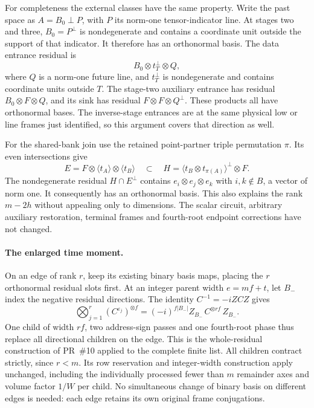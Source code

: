 For completeness the external classes have the same property. Write the
past space as $A=B_0\mathbin\perp P$, with $P$ its norm-one tensor-indicator
line. At stages two and three, $B_0=P^\perp$ is nondegenerate and contains
a coordinate unit outside the support of that indicator. It therefore
has an orthonormal basis. The data entrance residual is
\[
 B_0\otimes t_T^\perp\otimes Q,
\]
where $Q$ is a norm-one future line, and $t_T^\perp$ is nondegenerate and
contains coordinate units outside $T$. The stage-two auxiliary entrance
has residual $B_0\otimes F\otimes Q$, and its sink has residual
$F\otimes F\otimes Q^\perp$. These products all have orthonormal bases.
The inverse-stage entrances are at the same physical low or line frames
just identified, so this argument covers that direction as well.

For the shared-bank join use the retained point-partner triple permutation
$\pi$. Its even intersections give
\[
 E=F\otimes\langle t_A\rangle\otimes\langle t_B\rangle
 \quad\subset\quad
 H=\langle t_B\otimes t_{\pi(A)}\rangle^\perp\otimes F.
\]
The nondegenerate residual $H\cap E^\perp$ contains
$e_i\otimes e_j\otimes e_k$ with $i,k\notin B$, a vector of norm one.
It consequently has an orthonormal basis. This also explains the rank
$m-2h$ without appealing only to dimensions.
The scalar circuit, arbitrary auxiliary restoration, terminal frames and
fourth-root endpoint corrections have not changed.

\paragraph{The enlarged time moment.}
On an edge of rank $r$, keep its existing binary basis maps, placing the
$r$ orthonormal residual slots first. At an integer parent width
$e=mf+t$, let $B_-$ index the negative residual directions. The identity
$C^{-1}=-iZCZ$ gives
\[
 \bigotimes_{j=1}^{r}(C^{\varepsilon_j})^{\otimes f}
   =(-i)^{f|B_-|}Z_{B_-}\,C^{\otimes rf}\,Z_{B_-}.
\]
One child of width $rf$, two address-sign passes and one fourth-root
phase thus replace all directional children on the edge. This is the
whole-residual construction of PR~\#10 applied to the complete finite list.
All children contract strictly, since $r<m$. Its row reservation and
integer-width construction apply unchanged, including the individually
processed fewer than $m$ remainder axes and volume factor $1/W$ per child.
No simultaneous change of binary basis on different edges is needed: each
edge retains its own original frame conjugations.

